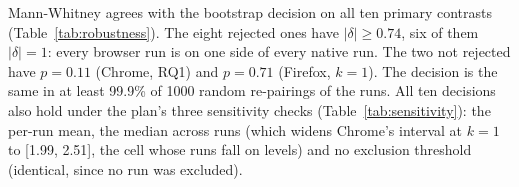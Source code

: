 


Mann-Whitney agrees with the bootstrap decision on all ten primary
contrasts (Table~\ref{tab:robustness}). The eight rejected ones have
$|\delta| \geq 0.74$, six of them $|\delta| = 1$: every browser run is on
one side of every native run. The two not rejected have $p = 0.11$ (Chrome,
RQ1) and $p = 0.71$ (Firefox, $k=1$). The decision is the same in at least
99.9\% of 1000 random re-pairings of the runs. All ten decisions also hold
under the plan's three sensitivity checks (Table~\ref{tab:sensitivity}):
the per-run mean, the median across runs (which widens Chrome's interval at
$k=1$ to [1.99, 2.51], the cell whose runs fall on levels) and no exclusion
threshold (identical, since no run was excluded).
